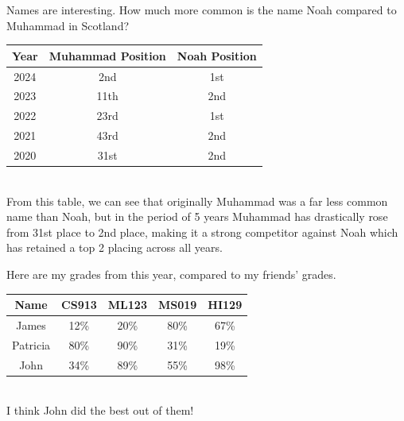 \documentclass[draft]{article}
\begin{document}
Names are interesting. How much more common is the name Noah compared to Muhammad in Scotland?
\\\begin{tabular}{ccc} %
	Year & Muhammad Position & Noah Position \\\hline
	2024 & 2nd & 1st \\
	2023 & 11th & 2nd \\
	2022 & 23rd & 1st \\
	2021 & 43rd & 2nd \\
	2020 & 31st & 2nd \\
\end{tabular}\\
From this table, we can see that originally Muhammad was a far less common name than Noah, but in the period of 5 years Muhammad has drastically rose from 31st place to 2nd place, making it a strong competitor against Noah which has retained a top 2 placing across all years.

Here are my grades from this year, compared to my friends' grades.
\\\begin{tabular}{ccccc} %
	Name & CS913 & ML123 & MS019 & HI129 \\\hline
	James & 12\% & 20\% & 80\% & 67\% \\
	Patricia & 80\% & 90\% & 31\% & 19\% \\
	John & 34\% & 89\% & 55\% & 98\%
\end{tabular}\\
I think John did the best out of them!
\end{document}
